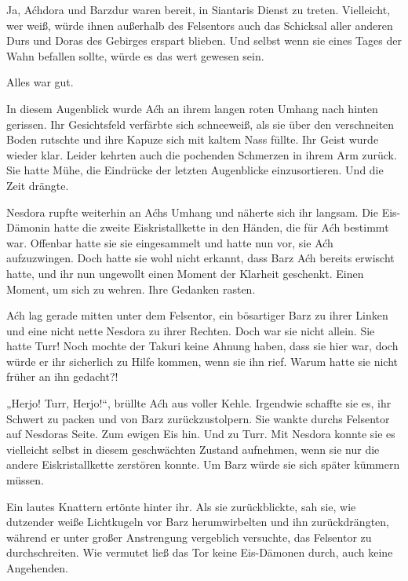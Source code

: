 Ja, Aćhdora und Barzdur waren bereit, in Siantaris Dienst zu treten. Vielleicht, wer weiß, würde ihnen außerhalb des Felsentors auch das Schicksal aller anderen Durs und Doras des Gebirges erspart blieben. Und selbst wenn sie eines Tages der Wahn befallen sollte, würde es das wert gewesen sein.

Alles war gut.\bigskip







In diesem Augenblick wurde Aćh an ihrem langen roten Umhang nach hinten gerissen. Ihr Gesichtsfeld verfärbte sich schneeweiß, als sie über den verschneiten Boden rutschte und ihre Kapuze sich mit kaltem Nass füllte. Ihr Geist wurde wieder klar. Leider kehrten auch die pochenden Schmerzen in ihrem Arm zurück. Sie hatte Mühe, die Eindrücke der letzten Augenblicke einzusortieren. Und die Zeit drängte.

Nesdora rupfte weiterhin an Aćhs Umhang und näherte sich ihr langsam. Die Eis-Dämonin hatte die zweite Eiskristallkette in den Händen, die für Aćh bestimmt war. Offenbar hatte sie sie eingesammelt und hatte nun vor, sie Aćh aufzuzwingen. Doch hatte sie wohl nicht erkannt, dass Barz Aćh bereits erwischt hatte, und ihr nun ungewollt einen Moment der Klarheit geschenkt. Einen Moment, um sich zu wehren. Ihre Gedanken rasten.

Aćh lag gerade mitten unter dem Felsentor, ein bösartiger Barz zu ihrer Linken und eine nicht nette Nesdora zu ihrer Rechten. Doch war sie nicht allein. Sie hatte Turr! Noch mochte der Takuri keine Ahnung haben, dass sie hier war, doch würde er ihr sicherlich zu Hilfe kommen, wenn sie ihn rief. Warum hatte sie nicht früher an ihn gedacht?!

„Herjo! Turr, Herjo!“, brüllte Aćh aus voller Kehle. Irgendwie schaffte sie es, ihr Schwert zu packen und von Barz zurückzustolpern. Sie wankte durchs Felsentor auf Nesdoras Seite. Zum ewigen Eis hin. Und zu Turr. Mit Nesdora konnte sie es vielleicht selbst in diesem geschwächten Zustand aufnehmen, wenn sie nur die andere Eiskristallkette zerstören konnte. Um Barz würde sie sich später kümmern müssen.

Ein lautes Knattern ertönte hinter ihr. Als sie zurückblickte, sah sie, wie dutzender weiße Lichtkugeln vor Barz herumwirbelten und ihn zurückdrängten, während er unter großer Anstrengung vergeblich versuchte, das Felsentor zu durchschreiten. Wie vermutet ließ das Tor keine Eis-Dämonen durch, auch keine Angehenden.

